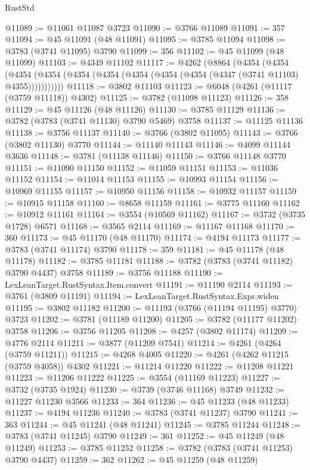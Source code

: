 \begin{lexlean}{RustStd}
\begin{coremodule}
@11089 := @11061 @11087 @3723
@11090 := @3766 @11089
@11091 := 357
@11094 := @45 @11091 (@48 @11091)
@11095 := @3785 @11094
@11098 := @3783 (@3741 @11095) @3790
@11099 := 356
@11102 := @45 @11099 (@48 @11099)
@11103 := @4349 @11102
@11117 := @4262
    (@8864
      (@4354
        (@4354
          (@4354 (@4354 (@4354 (@4354 (@4354 (@4354 (@4354 (@4347 (@3741 @11103) @4355)))))))))))
@11118 := @3802 @11103
@11123 := @6048 (@4261 (@11117 (@3759 @11118)) @4302)
@11125 := @3782 (@11098 @11123)
@11126 := 358
@11129 := @45 @11126 (@48 @11126)
@11130 := @3785 @11129
@11136 := @3782 (@3783 (@3741 @11130) @3790 @5469) @3758
@11137 := @11125 @11136
@11138 := @3756 @11137
@11140 := @3766 (@3802 @11095)
@11143 := @3766 (@3802 @11130) @3770
@11144 := @11140 @11143
@11146 := @4099 @11144 @3636
@11148 := @3781 (@11138 @11146)
@11150 := @3766 @11148 @3770
@11151 := @11090 @11150
@11152 := @11059 @11151
@11153 := @11036 @11152
@11154 := @11014 @11153
@11155 := @10993 @11154
@11156 := @10969 @11155
@11157 := @10950 @11156
@11158 := @10932 @11157
@11159 := @10915 @11158
@11160 := @8658 @11159
@11161 := @3775 @11160
@11162 := @10912 @11161
@11164 := @3554 (@10569 @11162)
@11167 := @3732 (@3735 @1728) @6571
@11168 := @3565 @2114
@11169 := @11167 @11168
@11170 := 360
@11173 := @45 @11170 (@48 @11170)
@11174 := @4194 @11173
@11177 := @3783 (@3741 @11174) @3790
@11178 := 359
@11181 := @45 @11178 (@48 @11178)
@11182 := @3785 @11181
@11188 := @3782 (@3783 (@3741 @11182) @3790 @4437) @3758
@11189 := @3756 @11188
@11190 := LexLeanTarget.RustSyntax.Item.convert
@11191 := @11190 @2114
@11193 := @3761 (@3809 @11191)
@11194 := LexLeanTarget.RustSyntax.Expr.widen
@11195 := @3802 @11182
@11200 := @11193 (@3766 (@11194 @11195) @3770) @3723
@11202 := @3781 (@11189 @11200)
@11205 := @3782 (@11177 @11202) @3758
@11206 := @3756 @11205
@11208 := @4257 (@3802 @11174)
@11209 := @4776 @2114
@11211 := @3877 (@11209 @7541)
@11214 := @4261 (@4264 (@3759 @11211))
@11215 := @4268 @4005
@11220 := @4261 (@4262 @11215 (@3759 @4058)) @4302
@11221 := @11214 @11220
@11222 := @11208 @11221
@11223 := @11206 @11222
@11225 := @3554 (@11169 @11223)
@11227 := @3732 (@3735 @1924)
@11230 := @3739 (@3746 @11168) @3749
@11232 := @11227 @11230 @3566
@11233 := 364
@11236 := @45 @11233 (@48 @11233)
@11237 := @4194 @11236
@11240 := @3783 (@3741 @11237) @3790
@11241 := 363
@11244 := @45 @11241 (@48 @11241)
@11245 := @3785 @11244
@11248 := @3783 (@3741 @11245) @3790
@11249 := 361
@11252 := @45 @11249 (@48 @11249)
@11253 := @3785 @11252
@11258 := @3782 (@3783 (@3741 @11253) @3790 @4437)
@11259 := 362
@11262 := @45 @11259 (@48 @11259)

\end{coremodule}
\end{lexlean}
